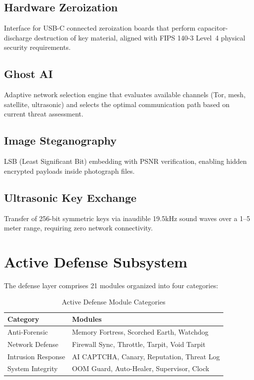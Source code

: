 \documentclass[11pt,a4paper]{article}
\begin{document}
\subsection{Hardware Zeroization}
Interface for USB-C connected zeroization boards that perform
capacitor-discharge destruction of key material, aligned with
FIPS 140-3 Level~4 physical security requirements.

\subsection{Ghost AI}
Adaptive network selection engine that evaluates available channels
(Tor, mesh, satellite, ultrasonic) and selects the optimal
communication path based on current threat assessment.

\subsection{Image Steganography}
LSB (Least Significant Bit) embedding with PSNR verification,
enabling hidden encrypted payloads inside photograph files.

\subsection{Ultrasonic Key Exchange}
Transfer of 256-bit symmetric keys via inaudible 19.5kHz sound
waves over a 1--5 meter range, requiring zero network connectivity.

\section{Active Defense Subsystem}
\label{sec:defense}

The defense layer comprises 21 modules organized into four categories:

\begin{table}[h]
\centering
\caption{Active Defense Module Categories}
\begin{tabular}{@{}ll@{}}
\toprule
\textbf{Category} & \textbf{Modules} \\
\midrule
Anti-Forensic & Memory Fortress, Scorched Earth, Watchdog \\
Network Defense & Firewall Sync, Throttle, Tarpit, Void Tarpit \\
Intrusion Response & AI CAPTCHA, Canary, Reputation, Threat Log \\
System Integrity & OOM Guard, Auto-Healer, Supervisor, Clock \\
\bottomrule
\end{tabular}
\end{table}
\end{document}

